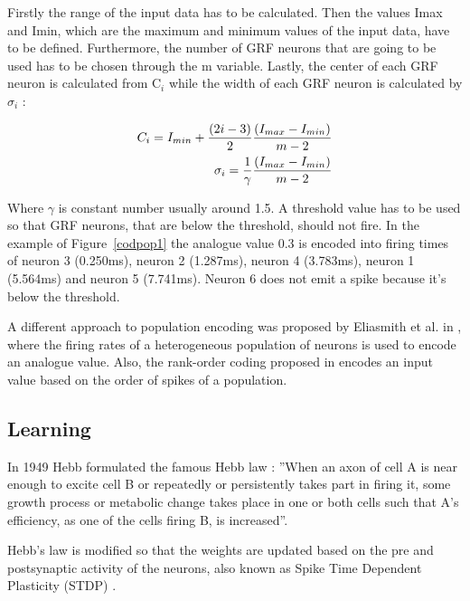 Firstly the range of the input data has to be calculated. Then the values Imax and Imin, which are the maximum and minimum values of the input data, have to be defined. Furthermore, the number of GRF neurons that are going to be used has to be chosen through the m variable. Lastly, the center of each GRF neuron is calculated from C$_{i}$ while the width of each GRF neuron is calculated by ${\sigma_i}$ \cite{Meftah:2010:SED:1873252.1873282}:

\begin{subequations}
\label{eq:popcod}
 \begin{align}
  C_i = I_{min} +{{(2i-3)}\over 2}    {{(I_{max} - I_{min})}\over m-2} \label{ci} \\
  \sigma_i = {1\over \gamma} {{(I_{max} - I_{min})}\over m-2} \label{si}
 \end{align}
\end{subequations}

Where ${\gamma}$ is constant number usually around 1.5. A threshold value has to be used so that GRF neurons, that are below the threshold, should not fire.  In the example of Figure~\ref{codpop1} the analogue value 0.3 is encoded into firing times of neuron 3 (0.250ms), neuron 2 (1.287ms), neuron 4 (3.783ms), neuron 1 (5.564ms) and neuron 5 (7.741ms). Neuron 6 does not emit a spike because it's below the threshold. 

A different approach to population encoding was proposed by Eliasmith et al. in \cite{Eliasmith02}, where the firing rates of a heterogeneous population of neurons is used to encode an analogue value. Also, the rank-order coding proposed in \cite{Thorpe2001715} encodes an input value based on the order of spikes of a population.  

\subsection{Learning}
In 1949 Hebb formulated the famous Hebb law \cite{Hebb1949}: ''When an axon of cell A is near enough to excite cell B or repeatedly or persistently takes part in firing it, some growth process or metabolic change takes place in one or both cells such that A's efficiency, as one of the cells firing B, is increased''.

Hebb's law is modified so that the weights are updated based on the pre and postsynaptic activity of the neurons, also known as Spike Time Dependent Plasticity (STDP) \cite{gernstbook}.

